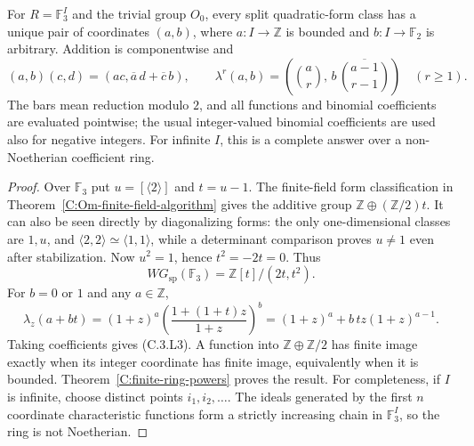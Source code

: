 \begin{corollary}
\label{C:finite-ring-powers-scalar}
For $R=\mathbb F_3^I$ and the trivial group $O_0$, every split
quadratic-form class has a unique pair of coordinates $(a,b)$,
where $a:I\to\mathbb Z$ is bounded and
$b:I\to\mathbb F_2$ is arbitrary. Addition is componentwise and
\[
 (a,b)(c,d)=(ac,\overline a\,d+\overline c\,b),\qquad
 \lambda^r(a,b)=
 \left(\binom ar,\,
       b\,\overline{\binom{a-1}{r-1}}\right)\quad(r\geq1).    \tag{C.3.L3}
\]
The bars mean reduction modulo $2$, and all functions and
binomial coefficients are evaluated pointwise; the usual
integer-valued binomial coefficients are used also for negative
integers. For infinite $I$, this is a complete answer over a
non-Noetherian coefficient ring.
\end{corollary}
\begin{proof}
Over $\mathbb F_3$ put
$u=[\langle2\rangle]$ and $t=u-1$.
The finite-field form classification in
Theorem~\ref{C:Om-finite-field-algorithm} gives the additive
group $\mathbb Z\oplus(\mathbb Z/2)t$.
It can also be seen directly by diagonalizing forms: the only
one-dimensional classes are $1,u$, and
$\langle2,2\rangle\simeq\langle1,1\rangle$, while a determinant
comparison proves $u\ne1$ even after stabilization.
Now $u^2=1$, hence $t^2=-2t=0$. Thus
\[
 WG_{\mathrm{sp}}(\mathbb F_3)
       =\mathbb Z[t]/(2t,t^2).
\]
For $b=0$ or $1$ and any $a\in\mathbb Z$,
\[
 \lambda_z(a+bt)
  =(1+z)^a\left(\frac{1+(1+t)z}{1+z}\right)^b
  =(1+z)^a+b\,t z(1+z)^{a-1}.
\]
Taking coefficients gives (C.3.L3). A function into
$\mathbb Z\oplus\mathbb Z/2$ has finite image exactly when
its integer coordinate has finite image, equivalently when it
is bounded. Theorem~\ref{C:finite-ring-powers} proves the result.
For completeness, if $I$ is infinite, choose distinct points
$i_1,i_2,\ldots$. The ideals generated by the first $n$
coordinate characteristic functions form a strictly increasing
chain in $\mathbb F_3^I$, so the ring is not Noetherian.
\end{proof}

